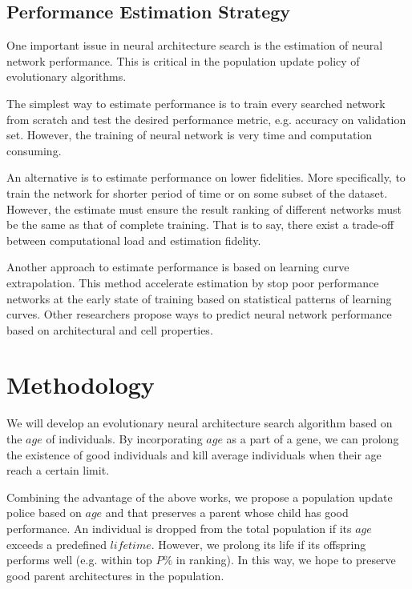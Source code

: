 \documentclass[conference]{IEEEtran}
\begin{document}
    \subsection{Performance Estimation Strategy}
    One important issue in neural architecture search is the estimation of neural network performance. This is critical in the population update policy of evolutionary algorithms. 

    The simplest way to estimate performance is to train every searched network from scratch and test the desired performance metric, e.g. accuracy on validation set. However, the training of neural network is very time and computation consuming. 
    
    An alternative is to estimate performance on lower fidelities. More specifically, to train the network for shorter period of time\cite{zoph2018learning} or on some subset of the dataset\cite{klein2016fast}. However, the estimate must ensure the result ranking of different networks must be the same as that of complete training. That is to say, there exist a trade-off between computational load and estimation fidelity.

    Another approach to estimate performance is based on learning curve extrapolation\cite{domhan2015speeding}. This method accelerate estimation by stop poor performance networks at the early state of training based on statistical patterns of learning curves. Other researchers propose ways to predict neural network performance based on architectural and cell properties\cite{liu2018progressive}. 

    \section{Methodology}

    We will develop an evolutionary neural architecture search algorithm based on the $age$ of individuals. By incorporating $age$ as a part of a gene, we can prolong the existence of good individuals\cite{DBLP:journals/corr/abs-1802-01548} and kill average individuals when their age reach a certain limit\cite{Hornby:2006:AAP:1143997.1144142}. 

    Combining the advantage of the above works, we propose a population update police based on $age$ and that preserves a parent whose child has good performance. An individual is dropped from the total population if its $age$ exceeds a predefined $lifetime$. However, we prolong its life if its offspring performs well (e.g. within top $P\%$ in ranking). In this way, we hope to preserve good parent architectures in the population.
\end{document}
